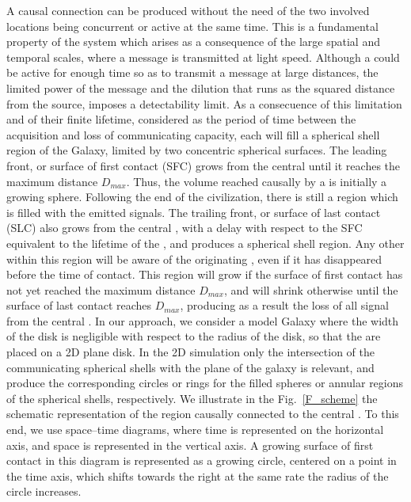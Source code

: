 A causal connection can be produced without the need of the two
involved locations being concurrent or active at the same time.
%
This is a fundamental property of the system which arises as a
consequence of the large spatial and temporal scales, where a message
is transmitted at light speed.
%
Although a \ceti could be active for enough time so as to transmit a
message at large distances, the limited power of the message and the
dilution that runs as the squared distance from the source, imposes a
detectability limit.
%
As a consecuence of this limitation and of their finite lifetime,
considered as the period of time between the acquisition and loss of
communicating capacity, each \ceti will fill a spherical shell region of
the Galaxy, limited by two concentric spherical surfaces.
%
The leading front, or surface of first contact (SFC) grows from the
central \ceti until it reaches the maximum distance $D_{max}$.
%
Thus, the volume reached causally by a \ceti is initially a growing
sphere.
%
Following the end of the civilization, there is still a region which
is filled with the emitted signals.
%
The trailing front, or surface of last contact (SLC) also grows from
the central \ceti, with a delay with respect to the SFC equivalent to
the lifetime of the \ceti, and produces a spherical shell region.
%
Any other \ceti within this region will be aware of the originating
\ceti,
even if it has disappeared before the time of contact.
%
This region will grow if the surface of first contact has not yet
reached the maximum distance $D_{max}$, and will shrink otherwise
until the surface of last contact reaches $D_{max}$, producing as a
result the loss of all signal from the central \ceti.
%
In our approach, we consider a model Galaxy where the width of the
disk is negligible with respect to the radius of the disk, so that the
\cetis are placed on a 2D plane disk.
%
In the 2D simulation only the intersection of the communicating
spherical shells with the plane of the galaxy is relevant, and produce
the corresponding circles or rings for the filled spheres or annular
regions of the spherical shells, respectively.
%
We illustrate in the Fig.~\ref{F_scheme} the schematic representation
of the region causally connected to the central \ceti.
%
To this end, we use space--time diagrams, where time is represented on
the horizontal axis, and space is represented in the vertical axis.
%
A growing surface of first contact in this diagram is represented as a
growing circle, centered on a point in the time axis, which shifts
towards the right at the same rate the radius of the circle increases.
